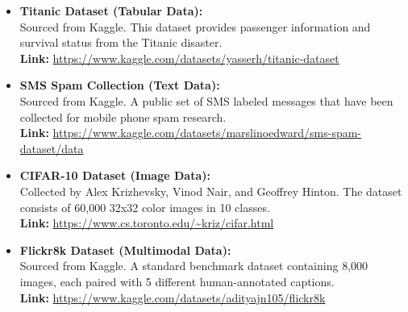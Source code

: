 \documentclass[twoside]{hcmut-report}
\begin{document}
\begin{itemize}
    \item \textbf{Titanic Dataset (Tabular Data):} \\
    Sourced from Kaggle. This dataset provides passenger information and survival status from the Titanic disaster. \\
    \textbf{Link:} \url{https://www.kaggle.com/datasets/yasserh/titanic-dataset}

    \item \textbf{SMS Spam Collection (Text Data):} \\
    Sourced from Kaggle. A public set of SMS labeled messages that have been collected for mobile phone spam research. \\
    \textbf{Link:} \url{https://www.kaggle.com/datasets/marslinoedward/sms-spam-dataset/data}

    \item \textbf{CIFAR-10 Dataset (Image Data):} \\
    Collected by Alex Krizhevsky, Vinod Nair, and Geoffrey Hinton. The dataset consists of 60,000 32x32 color images in 10 classes. \\
    \textbf{Link:} \url{https://www.cs.toronto.edu/~kriz/cifar.html}

    \item \textbf{Flickr8k Dataset (Multimodal Data):} \\
    Sourced from Kaggle. A standard benchmark dataset containing 8,000 images, each paired with 5 different human-annotated captions. \\
    \textbf{Link:} \url{https://www.kaggle.com/datasets/adityajn105/flickr8k}
\end{itemize}
\end{document}
